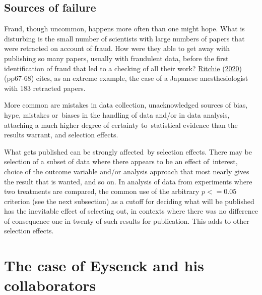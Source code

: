 \documentclass[
  10pt,
  b5paper]{book}
\begin{document}
\hypertarget{sources-of-failure}{%
\subsection*{Sources of failure}\label{sources-of-failure}}

Fraud, though uncommon, happens more often than one might hope.
What is disturbing is the small number of scientists with
large numbers of papers that were retracted on account of
fraud. How were they able to get away with publishing so
many papers, usually with fraudulent data, before the
first identification of fraud that led to a checking of all
their work? \protect\hyperlink{ref-ritchie2020science}{Ritchie} (\protect\hyperlink{ref-ritchie2020science}{2020}) (pp67-68) cites, as an
extreme example, the case of a Japanese anesthesiologist
with 183 retracted papers.

More common are mistakes in data collection, unacknowledged
sources of bias, hype, mistakes or~biases in the handling of
data and/or in data analysis, attaching a much higher
degree of certainty to~statistical evidence than the results
warrant, and selection effects.

What gets published can be strongly affected~by selection
effects. There may be selection of a subset of data where
there appears to be an effect of~interest, choice of the
outcome variable and/or analysis approach that most nearly
gives the result that is wanted, and so on. In analysis of
data from experiments where two treatments are compared,
the common use of the arbitrary \(p <= 0.05\) criterion
(see the next subsection) as a cutoff for deciding what
will be published has the inevitable effect of selecting out,
in contexts where there was no difference of consequence
one in twenty of such results for publication. This adds
to other selection effects.

\hypertarget{the-case-of-eysenck-and-his-collaborators}{%
\section{The case of Eysenck and his collaborators}\label{the-case-of-eysenck-and-his-collaborators}}
\end{document}

